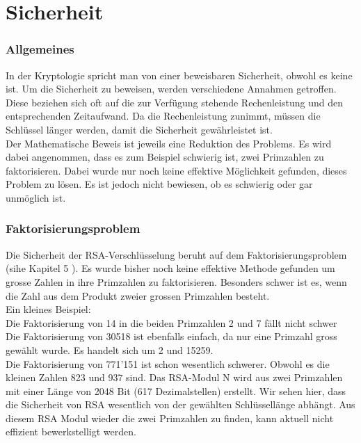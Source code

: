 \part{Sicherheit}
\section{Allgemeines}
In der Kryptologie spricht man von einer beweisbaren Sicherheit, obwohl es keine ist. Um die Sicherheit zu beweisen, werden verschiedene Annahmen getroffen. Diese beziehen sich oft auf die zur Verfügung stehende Rechenleistung und den entsprechenden Zeitaufwand. Da die Rechenleistung zunimmt, müssen die Schlüssel länger werden, damit die Sicherheit gewährleistet ist. \\
Der Mathematische Beweis ist jeweils eine Reduktion des Problems. Es wird dabei angenommen, dass es  zum Beispiel schwierig ist, zwei Primzahlen zu faktorisieren. Dabei wurde nur noch keine effektive Möglichkeit gefunden, dieses Problem zu lösen. Es ist jedoch nicht bewiesen, ob es schwierig oder gar unmöglich ist.
%
\section{Faktorisierungsproblem}
Die Sicherheit der RSA-Verschlüsselung beruht auf dem Faktorisierungsproblem (sihe Kapitel 5 \cite{rsa_and_public_key}). Es wurde bisher noch keine effektive Methode gefunden um grosse Zahlen in ihre Primzahlen zu faktorisieren. Besonders schwer ist es, wenn die Zahl aus dem Produkt zweier grossen Primzahlen besteht. \\
Ein kleines Beispiel:\\
Die Faktorisierung von 14 in die beiden Primzahlen 2 und 7 fällt nicht schwer\\
Die Faktorisierung von 30518 ist ebenfalls einfach, da nur eine Primzahl gross gewählt wurde. Es handelt sich um 2 und 15259. \\
Die Faktorisierung von 771'151 ist schon wesentlich schwerer. Obwohl es die kleinen Zahlen 823 und 937 sind. Das RSA-Modul N wird aus zwei Primzahlen mit einer Länge von 2048 Bit (617 Dezimalstellen) erstellt. Wir sehen hier, dass die Sicherheit von RSA wesentlich von der gewählten Schlüssellänge abhängt. Aus diesem RSA Modul wieder die zwei Primzahlen zu finden, kann aktuell nicht effizient bewerkstelligt werden.
%
